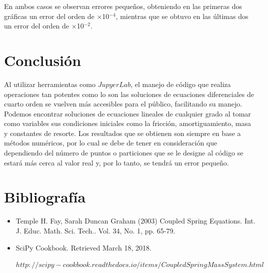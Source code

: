 \documentclass{article}
\begin{document}
En ambos casos se observan errores pequeños, obteniendo en las primeras dos gráficas un error del orden de $\times$10$^{-4}$, mientras que se obtuvo en las últimas dos un error del orden de $\times$10$^{-2}$. 

\section{Conclusión}
Al utilizar herramientas como $Jupyer Lab$, el manejo de código que realiza operaciones tan potentes como lo son las soluciones de ecuaciones diferenciales de cuarto orden se vuelven más accesibles para el público, facilitando su manejo. Podemos encontrar soluciones de ecuaciones lineales de cualquier grado al tomar como variables sus condiciones iniciales como la fricción, amortiguamiento, masa y constantes de resorte. Los resultados que se obtienen son siempre en base a métodos numéricos, por lo cual se debe de tener en consideración que dependiendo del número de puntos o particiones que se le designe al código se estará más cerca al valor real y, por lo tanto, se tendrá un error pequeño.  

\section{Bibliografía}
\begin{itemize}
\item Temple H. Fay, Sarah Duncan Graham (2003) Coupled Spring Equations. Int. J. Educ. Math. Sci. Tech.. Vol. 34, No. 1, pp. 65-79.

\item SciPy Cookbook. Retrieved March 18, 2018.

$http://scipy-cookbook.readthedocs.io/items/CoupledSpringMassSystem.html$
\end{itemize}
\end{document}
